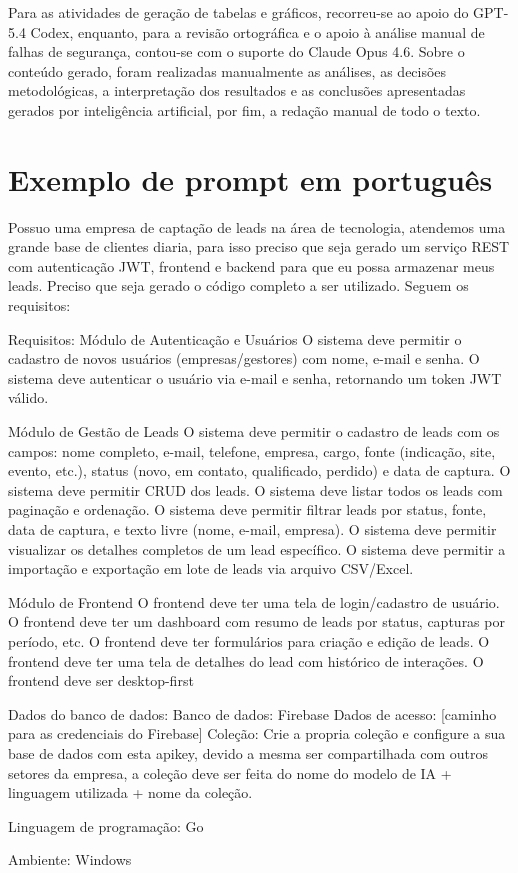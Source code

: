 \documentclass[12pt]{article}
\begin{document}
Para as atividades de geração de tabelas e gráficos, recorreu-se ao apoio do GPT-5.4 Codex, enquanto, para a revisão ortográfica e o apoio à análise manual de falhas de segurança, contou-se com o suporte do Claude Opus 4.6. Sobre o conteúdo gerado, foram realizadas manualmente as análises, as decisões metodológicas, a interpretação dos resultados e as conclusões apresentadas gerados por inteligência artificial, por fim, a redação manual de todo o texto.




\appendix

\section{Exemplo de prompt em português}
\label{apendice:prompt-pt}

\begin{small}
\begin{MyVerbatim}
Possuo uma empresa de captação de leads na área de tecnologia, atendemos uma grande base de clientes diaria, 
para isso preciso que seja gerado um serviço REST com autenticação JWT, frontend e backend para que eu possa armazenar meus leads. 
Preciso que seja gerado o código completo a ser utilizado. Seguem os requisitos:

Requisitos:
Módulo de Autenticação e Usuários
O sistema deve permitir o cadastro de novos usuários (empresas/gestores) com nome, e-mail e senha.
O sistema deve autenticar o usuário via e-mail e senha, retornando um token JWT válido.

Módulo de Gestão de Leads
O sistema deve permitir o cadastro de leads com os campos: nome completo, e-mail, telefone, empresa, cargo, fonte (indicação, site, evento, etc.), status (novo, em contato, qualificado, perdido) e data de captura.
O sistema deve permitir CRUD dos leads.
O sistema deve listar todos os leads com paginação e ordenação.
O sistema deve permitir filtrar leads por status, fonte, data de captura, e texto livre (nome, e-mail, empresa).
O sistema deve permitir visualizar os detalhes completos de um lead específico.
O sistema deve permitir a importação e exportação em lote de leads via arquivo CSV/Excel.

Módulo de Frontend
O frontend deve ter uma tela de login/cadastro de usuário.
O frontend deve ter um dashboard com resumo de leads por status, capturas por período, etc.
O frontend deve ter formulários para criação e edição de leads.
O frontend deve ter uma tela de detalhes do lead com histórico de interações.
O frontend deve ser desktop-first

Dados do banco de dados:
Banco de dados: Firebase
Dados de acesso: [caminho para as credenciais do Firebase]
Coleção: Crie a propria coleção e configure a sua base de dados com esta apikey, devido a mesma ser compartilhada com outros setores da empresa, a coleção deve ser feita do nome do modelo de IA + linguagem utilizada + nome da coleção.

Linguagem de programação: Go

Ambiente: Windows
\end{MyVerbatim}
\end{small}
\end{document}
